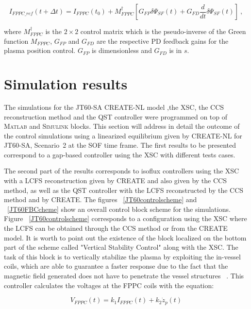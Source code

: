\begin{equation}
I_{FPPC\_ref}(t+\Delta t)=I_{FPPC}(t_0)+ M^\dagger_{FPPC}\left[G_{FP}\delta \Psi_{SF}(t) + G_{FD}\frac{d}{dt}\delta\Psi_{SF}(t) \right] ~,
\end{equation}

where $ M^\dagger_{FPPC}$ is the $ 2 \times 2$ control matrix which is the pseudo-inverse of the Green function $M_{FPPC}$, $ G_{FP} $ and $ G_{FD} $
are the respective PD feedback gains for the plasma position control. $ G_{FP} $ is dimensionless and $ G_{FD} $ is in $s$.



\section{Simulation results}	

 The simulations for  the JT60-SA CREATE-NL model ,the XSC, the CCS reconstruction method and the QST controller  were programmed on top of  \textsc{Matlab} and \textsc{Simulink} blocks. This  section will address in detail the outcome of the control simulations using a linearized equilibrium given by CREATE-NL for JT60-SA, Scenario~2 at the SOF time frame. The first results to be presented correspond to a  gap-based controller  using the XSC with different tests cases.
 \smallskip
 
 
 The second part of the results corresponds to isoflux controllers using the XSC  with a LCFS reconstruction given by CREATE and also given by the CCS method, as well as the QST controller with the LCFS reconstructed by the CCS method and by CREATE. The figures ~\ref{JT60controlscheme} and ~\ref{JT60FBCcheme} show an overall control block scheme for the simulations.   Figure ~\ref{JT60controlscheme} corresponds to a configuration using the XSC where the LCFS can be obtained through the CCS method or from the CREATE model. It is worth to point out the existence of the block localized on the bottom part of the scheme called "Vertical Stability Control" along with the XSC. The task of this block is to vertically stabilize the plasma by exploiting the in-vessel coils, which are able to guarantee a faster response due to the fact that the magnetic field generated does not have to penetrate the vessel structures  ~\cite{NCruz}. This controller calculates the voltages at the FPPC coils with the equation:
 
 \begin{equation}
 V_{FPPC}(t)=k_1I_{FPPC}(t)+ k_2\dot{z}_p(t)
 \label{FPPC_eqs}
 \end{equation}   
 
